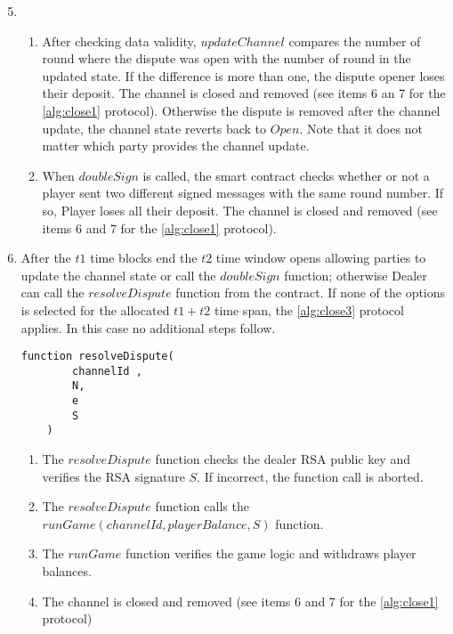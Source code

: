 \begin{algorithm}
\begin{enumerate}
	\setcounter{enumi}{4}
\item[]
\begin{enumerate}
	\item After checking data validity, $updateChannel$ compares the number of round where the dispute was open with the number of round in the updated state. If the difference is more than one, the dispute opener loses their deposit.  The channel is closed and removed (see items 6 an 7 for the \autoref{alg:close1} protocol). Otherwise the dispute is removed after the channel update, the channel state reverts back to $Open$. Note that it does not matter which party provides the channel update. \label{upd}
	\item When $doubleSign$ is called, the smart contract checks whether or not a player sent two different signed messages with the same round number. If so, Player loses all their deposit. The channel is closed and removed (see items 6 and 7 for the  \autoref{alg:close1} protocol). \label{dbl}
\end{enumerate}
	\item After the $t1$ time blocks end the $t2$ time window opens allowing parties to update the channel state or call the  $doubleSign$ function; otherwise Dealer can call the $resolveDispute$ function from the contract. If none of the options is selected for the allocated $t1+t2$ time span, the \autoref{alg:close3} protocol applies. In this case no additional steps follow. \label{block}
\begin{lstlisting}
function resolveDispute(
        channelId ,
        N,
        e
        S
    )
\end{lstlisting}
\begin{enumerate}
	\item  The $resolveDispute$ function checks the dealer RSA public key and verifies the RSA signature $S$. If incorrect, the function call is aborted.
	\item The $resolveDispute$ function calls the $runGame(channelId , playerBalance, S)$ function.
	 \item The $runGame$ function verifies the game logic and withdraws player balances.
	\item  The channel is closed and removed (see items 6 and 7 for the \autoref{alg:close1} protocol)
\end{enumerate}
\end{enumerate}
\end{algorithm}

